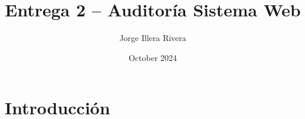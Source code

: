 \documentclass{article}
\title{Entrega 2 – Auditoría Sistema Web}
\author{Jorge Illera Rivera}
\date{October 2024}
\begin{document}
	
	\maketitle
	
	\section{Introducción}
\end{document}
